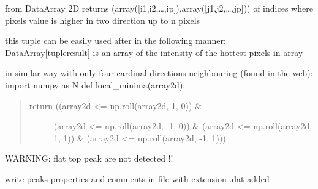 \documentclass[letterpaper,10pt,english]{sphinxmanual}
\begin{document}

\begin{fulllineitems}
\label{\detokenize{PeakSearch:LaueTools.readmccd.localmaxima}}
from DataArray 2D  returns (array({[}i1,i2,…,ip{]}),array({[}j1,j2,…,jp{]}))
of indices where pixels value is higher in two direction up to n pixels

this tuple can be easily used after in the following manner:
DataArray{[}tupleresult{]} is an array of the intensity of the hottest pixels in array

in similar way with only four cardinal directions neighbouring (found in the web):
import numpy as N
def local\_minima(array2d):
\begin{quote}
\begin{description}
\item[{return ((array2d \textless{}= np.roll(array2d,  1, 0)) \&}] \leavevmode
(array2d \textless{}= np.roll(array2d, -1, 0)) \&
(array2d \textless{}= np.roll(array2d,  1, 1)) \&
(array2d \textless{}= np.roll(array2d, -1, 1)))

\end{description}
\end{quote}

WARNING: flat top peak are not detected !!

\end{fulllineitems}


\begin{fulllineitems}
\label{\detokenize{PeakSearch:LaueTools.readmccd.writepeaklist}}
write peaks properties and comments in file with extension .dat added

\end{fulllineitems}

\end{document}
